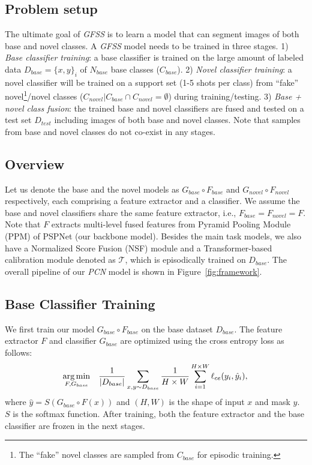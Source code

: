 \documentclass[journal]{IEEEtran}
\begin{document}
\subsection{Problem setup} The ultimate goal of \textit{GFSS} is to learn a model that can segment images of both base and novel classes. 
A \textit{GFSS} model needs to be trained in three stages. 1) \emph{Base classifier training}: a base classifier is trained on the large amount of labeled data $D_{base}=\{x, y\}_{i}^{}$ of $N_{base}$ base classes ($C_{base}$).
2) \emph{Novel classifier training}: a novel classifier will be trained on a support set (1-5 shots per class) from ``fake'' novel\footnote{The ``fake'' novel classes are sampled from $C_{base}$ for episodic training.}/novel classes ($C_{novel}| C_{base} \cap C_{novel} = \emptyset$) during training/testing.
3) \emph{Base + novel class fusion}: the trained base and novel classifiers are fused and  tested on a test set $D_{test}$ including images of both base and novel classes.
Note that samples from base and novel classes do not co-exist in any stages.

\subsection{Overview} Let us denote the base and the novel models as $G_{base} \circ F_{base}$ and $G_{novel} \circ F_{novel}$ respectively, each comprising a feature extractor and a classifier. We assume the base and novel classifiers share the same feature extractor, i.e., $F_{base}=F_{novel}=F$.
Note that $F$ extracts multi-level fused features from Pyramid Pooling Module (PPM) of PSPNet \cite{zhao2017pyramid} (our backbone model).
Besides the main task models, we also have a  Normalized Score Fusion (NSF) module and a Transformer-based calibration module denoted as $\mathcal{T}$, which is episodically trained on $D_{base}$. 
The overall pipeline of our \textit{PCN} model is shown in Figure~\ref{fig:framework}.

\subsection{Base Classifier Training}
We first train our model $G_{base} \circ F_{base}$ on the base dataset $D_{base}$. The feature extractor $F$ and classifier $G_{base}$ are optimized using the cross entropy loss as follows:
\begin{equation}
\underset{F, G_{base}}{\arg\min}\quad \frac{1}{|D_{base}|}\sum_{x, y\sim D_{base}} \frac{1}{H\times W}\sum_{i=1}^{H\times W} \ell_{ce}(y_{i}, \hat{y}_i),  \\
    \label{base_clf}
\end{equation}
where $\hat{y}=S(G_{base}\circ F(x))$ and $(H,W)$ is the shape of input $x$ and mask $y$. $S$ is the softmax function. After training, both the feature extractor and the base classifier are frozen in the next stages.
\end{document}
